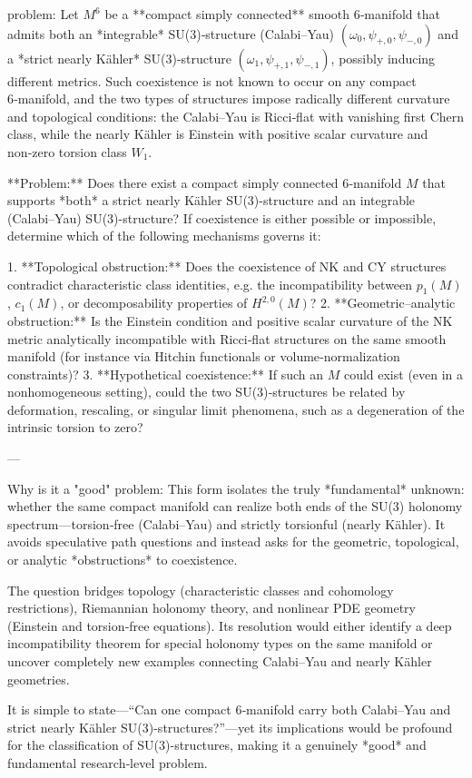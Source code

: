problem:  
Let \(M^6\) be a **compact simply connected** smooth 6‑manifold that admits both an *integrable* SU(3)‑structure (Calabi–Yau) \((\omega_0, \psi_{+,0}, \psi_{-,0})\) and a *strict nearly Kähler* SU(3)‑structure \((\omega_1, \psi_{+,1}, \psi_{-,1})\), possibly inducing different metrics.  
Such coexistence is not known to occur on any compact 6‑manifold, and the two types of structures impose radically different curvature and topological conditions: the Calabi–Yau is Ricci‑flat with vanishing first Chern class, while the nearly Kähler is Einstein with positive scalar curvature and non‑zero torsion class \(W_1\).  

**Problem:**  
Does there exist a compact simply connected 6‑manifold \(M\) that supports *both* a strict nearly Kähler SU(3)-structure and an integrable (Calabi–Yau) SU(3)-structure?  
If coexistence is either possible or impossible, determine which of the following mechanisms governs it:

1. **Topological obstruction:** Does the coexistence of NK and CY structures contradict characteristic class identities, e.g. the incompatibility between \(p_1(M)\), \(c_1(M)\), or decomposability properties of \(H^{2,0}(M)\)?  
2. **Geometric–analytic obstruction:** Is the Einstein condition and positive scalar curvature of the NK metric analytically incompatible with Ricci‑flat structures on the same smooth manifold (for instance via Hitchin functionals or volume‑normalization constraints)?  
3. **Hypothetical coexistence:** If such an \(M\) could exist (even in a nonhomogeneous setting), could the two SU(3)‑structures be related by deformation, rescaling, or singular limit phenomena, such as a degeneration of the intrinsic torsion to zero?  

---

Why is it a "good" problem:  
This form isolates the truly *fundamental* unknown: whether the same compact manifold can realize both ends of the SU(3) holonomy spectrum—torsion‑free (Calabi–Yau) and strictly torsionful (nearly Kähler). It avoids speculative path questions and instead asks for the geometric, topological, or analytic *obstructions* to coexistence.  

The question bridges topology (characteristic classes and cohomology restrictions), Riemannian holonomy theory, and nonlinear PDE geometry (Einstein and torsion‑free equations). Its resolution would either identify a deep incompatibility theorem for special holonomy types on the same manifold or uncover completely new examples connecting Calabi–Yau and nearly Kähler geometries.  

It is simple to state—“Can one compact 6‑manifold carry both Calabi–Yau and strict nearly Kähler SU(3)-structures?”—yet its implications would be profound for the classification of SU(3)-structures, making it a genuinely *good* and fundamental research‑level problem.